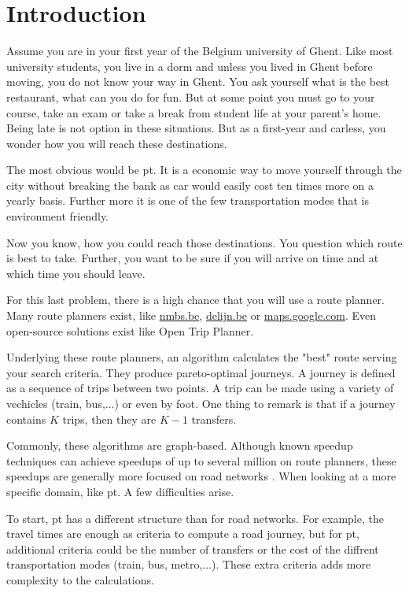 \chapter{Introduction}
\label{chap:intro}

Assume you are in your first year of the Belgium university of Ghent. Like most university students, you live in a dorm and unless you lived in Ghent before moving, you do not know your way in Ghent. You ask yourself what is the best restaurant, what can you do for fun. But at some point you must go to your course, take an exam or take a break from student life at your parent's home. Being late is not option in these situations. But as a first-year and carless, you wonder how you will reach these destinations.  


The most obvious would be \acrfull{pt}. It is a economic way to move yourself through the city without breaking the bank as car would easily cost ten times more on a yearly basis. Further more it is one of the few transportation modes that is environment friendly.

Now you know, how you could reach those destinations. You question which route is best to take. Further, you want to be sure if you will arrive on time and at which time you should leave. 

For this last problem, there is a high chance that you will use a route planner. Many route planners exist, like \url{nmbs.be}, \url{delijn.be} or \url{maps.google.com}. Even open-source solutions exist like Open Trip Planner\cite{noauthor_otp_2023}.

Underlying these route planners, an algorithm calculates the "best" route serving your search criteria. They produce pareto-optimal journeys. A journey is defined as a sequence of trips between two points. A trip can be made using a variety of vechicles (train, bus,...) or even by foot. One thing to remark is that if a journey contains $K$ trips, then they are $K-1$ transfers. %

Commonly, these algorithms are graph-based. Although known speedup techniques can achieve speedups of up to several million on route planners, these speedups are generally more focused on road networks \cite{delling_round-based_2015}. When looking at a more specific domain, like \acrshort{pt}. A few difficulties arise.

To start, \acrshort{pt} has a different structure than for road networks. For example, the travel times are enough as criteria to compute a road journey, but for \acrshort{pt}, additional criteria could be the number of transfers or the cost of the diffrent transportation modes (train, bus, metro,...). These extra criteria adds more complexity to the calculations.

